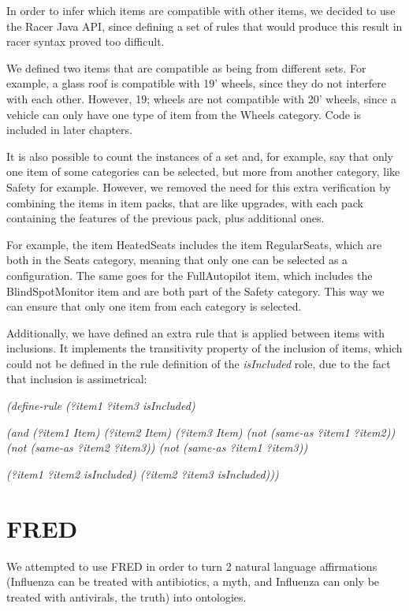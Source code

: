 \documentclass[a4paper,12pt]{report}
\begin{document}
\bigskip
In order to infer which items are compatible with other items, we decided to use the Racer Java API, since defining a set of rules that would produce this result in racer syntax proved too difficult.

We defined two items that are compatible as being from different sets. For example, a glass roof is compatible with 19' wheels, since they do not interfere with each other. However, 19; wheels are not compatible with 20' wheels, since a vehicle can only have one type of item from the Wheels category. Code is included in later chapters.  

\bigskip
It is also possible to count the instances of a set and, for example, say that only one item of some categories can be selected, but more from another category, like Safety for example. However, we removed the need for this extra verification by combining the items in item packs, that are like upgrades, with each pack containing the features of the previous pack, plus additional ones.

\bigskip
For example, the item HeatedSeats includes the item RegularSeats, which are both in the Seats category, meaning that only one can be selected as a configuration. The same goes for the FullAutopilot item, which includes the BlindSpotMonitor item and are both part of the Safety category. This way we can ensure that only one item from each category is selected.

\bigskip
Additionally, we have defined an extra rule that is applied between items with inclusions. It implements the transitivity property of the inclusion of items, which could not be defined in the rule definition of the \textit{isIncluded} role, due to the fact that inclusion is assimetrical:

\begin{center}

    \textit{(define-rule (?item1 ?item3 isIncluded)}
    
    \textit{(and (?item1 Item) (?item2 Item) (?item3 Item) (not (same-as ?item1 ?item2)) (not (same-as ?item2 ?item3)) (not (same-as ?item1 ?item3))}
    
    \textit{(?item1 ?item2 isIncluded) (?item2 ?item3 isIncluded))) }
    
\end{center} 

\chapter{FRED}
We attempted to use FRED in order to turn 2 natural language affirmations (Influenza can be treated with antibiotics, a myth, and Influenza can only be treated with antivirals, the truth) into ontologies.
\end{document}
